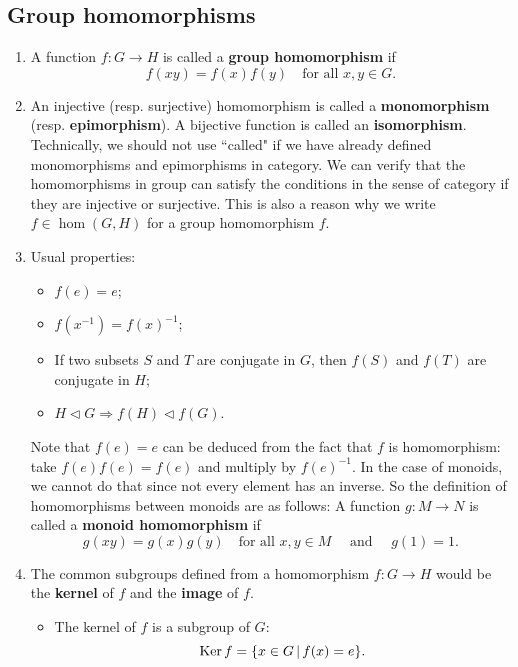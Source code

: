 \subsection*{Group homomorphisms}
\begin{enumerate}[(1)]
	\item A function $f:G\rightarrow H$ is called a \textbf{group homomorphism} if 
	\begin{equation*}
		f(xy) = f(x)f(y)\quad\text{for all }x,y\in G.
	\end{equation*}
	\item An injective (resp. surjective) homomorphism is called a \textbf{monomorphism} (resp. \textbf{epimorphism}). A bijective function is called an \textbf{isomorphism}. Technically, we should not use ``called" if we have already defined monomorphisms and epimorphisms in category. We can verify that the homomorphisms in group can satisfy the conditions in the sense of category if they are injective or surjective. This is also a reason why we write $f\in\operatorname{hom}(G,H)$ for a group homomorphism $f$.
	\item Usual properties:
	\begin{itemize}
		\item $f(e) = e$;
		\item $f(x^{-1})  =f(x)^{-1}$;
		\item If two subsets $S$ and $T$ are conjugate in $G$, then $f(S)$ and $f(T)$ are conjugate in $H$;
		\item $H\lhd G\Rightarrow f(H)\lhd f(G)$.
	\end{itemize}Note that $f(e)=e$ can be deduced from the fact that $f$ is homomorphism: take $f(e)f(e) = f(e)$ and multiply by $f(e)^{-1}$. In the case of monoids, we cannot do that since not every element has an inverse. So the definition of homomorphisms between monoids are as follows: A function $g:M\rightarrow N$ is called a \textbf{monoid homomorphism} if
	\begin{equation*}
		g(xy) = g(x)g(y)\quad \text{for all }x,y\in M\quad \text{ and } \quad  g(1) = 1.
	\end{equation*}
	\item The common subgroups defined from a homomorphism $f:G\rightarrow H$ would be the \textbf{kernel} of $f$ and the \textbf{image} of $f$.
	\begin{itemize}
		\item The kernel of $f$ is a subgroup of $G$:
		\begin{equation*}
			\Ker f = \{x\in G\,|\, f(x)=e\}.

\end{equation*}
\end{itemize}
\end{enumerate}

